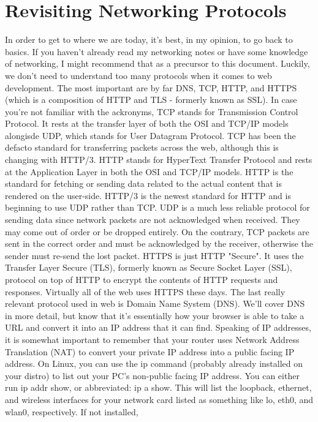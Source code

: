 \documentclass{article}
\begin{document}
\section{Revisiting Networking Protocols}

In order to get to where we are today, it's best, in my opinion, to go back to basics. If you haven't already
read my networking notes or have some knowledge of networking, I might recommend that as a precursor to this
document. Luckily, we don't need to understand too many protocols when it comes to web development. The most
important are by far DNS, TCP, HTTP, and HTTPS (which is a composition of HTTP and TLS - formerly known as SSL).
In case you're not familiar with the ackronyms, TCP stands for Transmission Control Protocol. It rests at the
transfer layer of both the OSI and TCP/IP models alongisde UDP, which stands for User Datagram Protocol. TCP
has been the defacto standard for transferring packets across the web, although this is changing with HTTP/3.
HTTP stands for HyperText Transfer Protocol and rests at the Application Layer in both the OSI and TCP/IP
models. HTTP is the standard for fetching or sending data related to the actual content that is rendered on the
user-side. HTTP/3 is the newest standard for HTTP and is beginning to use UDP rather than TCP. UDP is a much
less reliable protocol for sending data since network packets are not acknowledged when received. They may come
out of order or be dropped entirely. On the contrary, TCP packets are sent in the correct order and must be
acknowledged by the receiver, otherwise the sender must re-send the lost packet. HTTPS is just HTTP "Secure".
It uses the Transfer Layer Secure (TLS), formerly known as Secure Socket Layer (SSL), protocol on top of HTTP
to encrypt the contents of HTTP requests and responses. Virtually all of the web uses HTTPS these days. The
last really relevant protocol used in web is Domain Name System (DNS). We'll cover DNS in more detail, but know
that it's essentially how your browser is able to take a URL and convert it into an IP address that it can
find. Speaking of IP addresses, it is somewhat important to remember that your router uses Network Address
Translation (NAT) to convert your private IP address into a public facing IP address. On Linux, you can use the
ip command (probably already installed on your distro) to list out your PC's non-public facing IP address. You
can either run ip addr show, or abbreviated: ip a show. This will list the loopback, ethernet, and wireless
interfaces for your network card listed as something like lo, eth0, and wlan0, respectively. If not installed,
\end{document}
